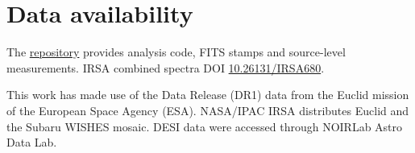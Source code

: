 \documentclass{aa}
\begin{document}
\section*{Data availability}
The \href{https://github.com/Biswajit1999/daily-astro-notebooks/tree/master/euclid-dr1-foundation/2026-11-15-day02}{repository} provides analysis code, FITS stamps and source-level measurements. IRSA combined spectra DOI \href{https://doi.org/10.26131/IRSA680}{10.26131/IRSA680}.
\begin{acknowledgements}
This work has made use of the Data Release (DR1) data from the Euclid mission of the European Space Agency (ESA). NASA/IPAC IRSA distributes Euclid and the Subaru WISHES mosaic. DESI data were accessed through NOIRLab Astro Data Lab.
\end{acknowledgements}


\end{document}

